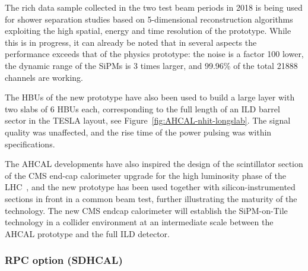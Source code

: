 %
%
The rich data sample collected in the two test beam periods in 2018  is being used for shower separation studies based on 5-dimensional reconstruction algorithms exploiting the high spatial, energy and time resolution of the prototype. 
While this is in progress, it can already be noted that in several aspects the  performance exceeds that of the physics prototype: the noise is a factor 100 lower, the dynamic range of the SiPMs is 3 times larger, and 99.96\% of the total 21888 channels are working.

The HBUs of the new prototype have also been used to build a large layer with two slabs of 6 HBUs each, corresponding to the full length of an ILD barrel sector in the TESLA layout, see Figure~\ref{fig:AHCAL-nhit-longslab}. The signal quality was unaffected, and the rise time of the power pulsing was within specifications. 

The AHCAL developments have also inspired the design of the scintillator section of the CMS end-cap calorimeter upgrade for the high luminosity phase of the LHC~\cite{Collaboration:2293646}, and the new prototype has been used together with silicon-instrumented sections in front in a common beam test, further illustrating the maturity of the technology. 
The new CMS endcap calorimeter will establish the SiPM-on-Tile technology in a collider environment at an intermediate scale between the AHCAL prototype and the full ILD detector. 

\subsubsection{RPC option (SDHCAL)}

